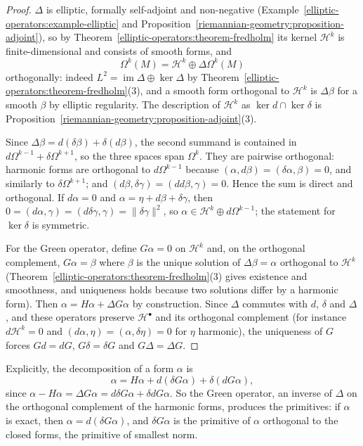 \begin{proof}
$\Delta$ is elliptic, formally self-adjoint and non-negative (Example~\ref{elliptic-operators:example-elliptic} and
Proposition~\ref{riemannian-geometry:proposition-adjoint}), so by Theorem~\ref{elliptic-operators:theorem-fredholm} its kernel $\mathcal{H}^k$ is finite-dimensional and consists of smooth forms, and
\[
\Omega^k(M) = \mathcal{H}^k \oplus \Delta\Omega^k(M)
\]
orthogonally: indeed $L^2 = \operatorname{im}\Delta \oplus \ker\Delta$ by Theorem~\ref{elliptic-operators:theorem-fredholm}(3), and a smooth form orthogonal to $\mathcal{H}^k$ is $\Delta\beta$ for a smooth $\beta$
by elliptic regularity. The description of $\mathcal{H}^k$ as $\ker d \cap \ker\delta$ is
Proposition~\ref{riemannian-geometry:proposition-adjoint}(3).

Since $\Delta\beta = d(\delta\beta) + \delta(d\beta)$, the second summand is contained in $d\Omega^{k-1} + \delta\Omega^{k+1}$, so the three spaces span $\Omega^k$. They are pairwise orthogonal: harmonic forms are
orthogonal to $d\Omega^{k-1}$ because $(\alpha, d\beta) = (\delta\alpha, \beta) = 0$, and similarly to $\delta\Omega^{k+1}$; and $(d\beta, \delta\gamma) = (dd\beta, \gamma) = 0$. Hence the sum is direct and
orthogonal. If $d\alpha = 0$ and $\alpha = \eta + d\beta + \delta\gamma$, then $0 = (d\alpha, \gamma) = (d\delta\gamma, \gamma) = \|\delta\gamma\|^2$, so $\alpha \in \mathcal{H}^k \oplus d\Omega^{k-1}$; the statement for
$\ker\delta$ is symmetric.

For the Green operator, define $G\alpha = 0$ on $\mathcal{H}^k$ and, on the orthogonal complement, $G\alpha = \beta$ where $\beta$ is the unique solution of $\Delta\beta = \alpha$ orthogonal to $\mathcal{H}^k$
(Theorem~\ref{elliptic-operators:theorem-fredholm}(3) gives existence and smoothness, and uniqueness holds because two solutions differ by a harmonic form). Then $\alpha = H\alpha + \Delta G\alpha$ by
construction. Since $\Delta$ commutes with $d$, $\delta$ and $\Delta$, and these operators preserve $\mathcal{H}^\bullet$ and its orthogonal complement (for instance $d\mathcal{H}^k = 0$ and
$(d\alpha, \eta) = (\alpha, \delta\eta) = 0$ for $\eta$ harmonic), the uniqueness of $G$ forces $Gd = dG$, $G\delta = \delta G$ and $G\Delta = \Delta G$.
\end{proof}

Explicitly, the decomposition of a form $\alpha$ is
\[
\alpha = H\alpha + d(\delta G\alpha) + \delta(dG\alpha),
\]
since $\alpha - H\alpha = \Delta G\alpha = d\delta G\alpha + \delta dG\alpha$. So the Green operator, an inverse of $\Delta$ on the orthogonal complement of the harmonic forms, produces the primitives: if $\alpha$ is
exact, then $\alpha = d(\delta G\alpha)$, and $\delta G\alpha$ is the primitive of $\alpha$ orthogonal to the closed forms, the primitive of smallest norm.

